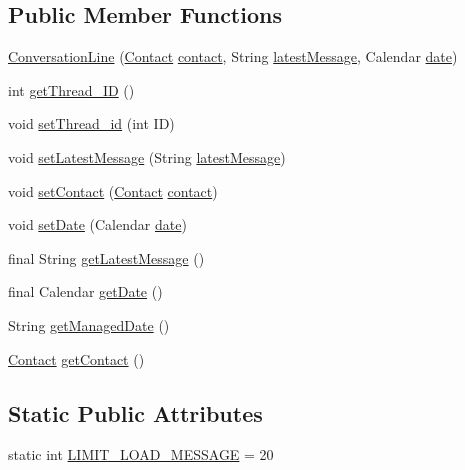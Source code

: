 \subsection*{Public Member Functions}
\begin{DoxyCompactItemize}
\item 
\hyperlink{a00008_a80a547afe975a7118b8cc354c41b2835}{Conversation\+Line} (\hyperlink{a00005}{Contact} \hyperlink{a00008_a3459849ab29ad684658dbcd0cf8c5d5a}{contact}, String \hyperlink{a00008_ae482a1ec09eba288cd2a19d22c3c9f3a}{latest\+Message}, Calendar \hyperlink{a00008_aa713d1025d73543bd4eae313a1868570}{date})
\item 
int \hyperlink{a00008_aebf2c5bb10824f5fcbd32677c8152735}{get\+Thread\+\_\+\+I\+D} ()
\item 
void \hyperlink{a00008_a27e124edc933b9954443e1b29b544bac}{set\+Thread\+\_\+id} (int I\+D)
\item 
void \hyperlink{a00008_a33f2ab55a4ba0636593f02f0322f3dd0}{set\+Latest\+Message} (String \hyperlink{a00008_ae482a1ec09eba288cd2a19d22c3c9f3a}{latest\+Message})
\item 
void \hyperlink{a00008_abef3c7b6635dc06ac6b8e4b37c51b37f}{set\+Contact} (\hyperlink{a00005}{Contact} \hyperlink{a00008_a3459849ab29ad684658dbcd0cf8c5d5a}{contact})
\item 
void \hyperlink{a00008_a65c1a5dad9225d01d585af72e0c80138}{set\+Date} (Calendar \hyperlink{a00008_aa713d1025d73543bd4eae313a1868570}{date})
\item 
final String \hyperlink{a00008_a10a2abf152f4957caca28c562fc33168}{get\+Latest\+Message} ()
\item 
final Calendar \hyperlink{a00008_a6d7bc612b8eee5382e11d9847e2f878e}{get\+Date} ()
\item 
String \hyperlink{a00008_aa53441954dd0352c8b8964194365c688}{get\+Managed\+Date} ()
\item 
\hyperlink{a00005}{Contact} \hyperlink{a00008_adb647c7ae09f1d5755db63d701968925}{get\+Contact} ()
\end{DoxyCompactItemize}
\subsection*{Static Public Attributes}
\begin{DoxyCompactItemize}
\item 
static int \hyperlink{a00008_a9d23fb3258cdafe6a3c4bb95f7ee886f}{L\+I\+M\+I\+T\+\_\+\+L\+O\+A\+D\+\_\+\+M\+E\+S\+S\+A\+G\+E} = 20
\end{DoxyCompactItemize}
